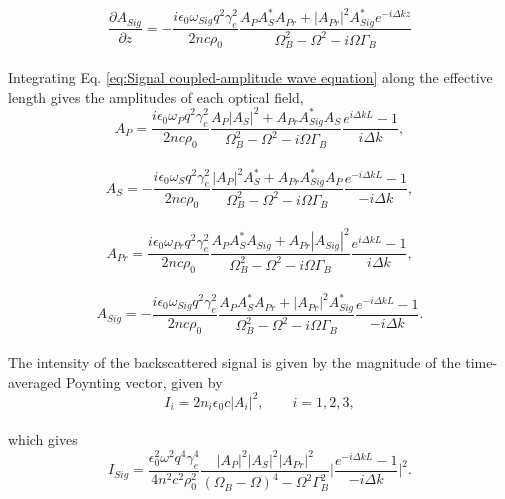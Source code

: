 \documentclass[%
  reprint,
  superscriptaddress,
  amsmath,amssymb,
  aps,
  prapplied,
]{revtex4-2}
\begin{document}
\\
\begin{equation}
    \frac{\partial A_{Sig}}{\partial z} = -\frac{i\epsilon_{0}\omega_{Sig} q^{2}\gamma_{e}^{2}}{2nc\rho_{0}}\frac{A_{P}A_{S}^{*}A_{Pr} + |A_{Pr}|^{2}A_{Sig}^{*}e^{-i\Delta kz}}{\Omega_{B}^{2} - \Omega^{2} - i\Omega\Gamma_{B}}
    \label{eq:Signal coupled-amplitude wave equation}
\end{equation}
\\
Integrating Eq. \ref{eq:Signal coupled-amplitude wave equation} along the effective length gives the amplitudes of each optical field,
\\
\begin{equation}
  A_{P} = \frac{i\epsilon_{0}\omega_{P}q^{2}\gamma_{e}^{2}}{2nc\rho_{0}}\frac{A_{P}|A_{S}|^{2} + A_{Pr}A_{Sig}^{*}A_{S}}{\Omega_{B}^{2}-\Omega^{2}-i\Omega\Gamma_{B}} \frac{e^{i\Delta kL}-1}{i\Delta k},
\end{equation}
\\
\begin{equation}
  A_{S} = -\frac{i\epsilon_{0}\omega_{S}q^{2}\gamma_{e}^{2}}{2nc\rho_{0}}\frac{|A_{P}|^{2}A_{S}^{*} + A_{Pr}A_{Sig}^{*}A_{P}}{\Omega_{B}^{2}-\Omega^{2}-i\Omega\Gamma_{B}} \frac{e^{-i\Delta kL}-1}{-i\Delta k},
\end{equation}
\\
\begin{equation}
  A_{Pr} = \frac{i\epsilon_{0}\omega_{Pr}q^{2}\gamma_{e}^{2}}{2nc\rho_{0}}\frac{A_{P}A_{S}^{*}A_{Sig} + A_{Pr}|A_{Sig}|^{2}}{\Omega_{B}^{2}-\Omega^{2}-i\Omega\Gamma_{B}} \frac{e^{i\Delta kL}-1}{i\Delta k},
\end{equation}
\\
\begin{equation}
  A_{Sig} = -\frac{i\epsilon_{0}\omega_{Sig}q^{2}\gamma_{e}^{2}}{2nc\rho_{0}}\frac{A_{P}A_{S}^{*}A_{Pr} + |A_{Pr}|^{2}A_{Sig}^{*}}{\Omega_{B}^{2}-\Omega^{2}-i\Omega\Gamma_{B}} \frac{e^{-i\Delta kL}-1}{-i\Delta k}.
\end{equation}
\\
The intensity of the backscattered signal is given by the magnitude of the time-averaged Poynting vector, given by
\\
\begin{equation}
  I_{i} = 2n_{i}\epsilon_{0}c|A_{i}|^{2}, \qquad i = 1,2,3,
\end{equation}
\\
which gives
\\
\begin{equation}
  I_{Sig} = \frac{\epsilon_{0}^{2}\omega^{2}q^{4}\gamma_{e}^{4}}{4n^{2}c^{2}\rho_{0}^{2}}\frac{|A_{P}|^{2}|A_{S}|^{2}|A_{Pr}|^{2}}{(\Omega_{B} - \Omega)^{4} - \Omega^{2}\Gamma_{B}^{2}}\bigg|\frac{e^{-i\Delta kL} - 1}{-i\Delta k}\bigg|^{2}.
\end{equation}
\end{document}
